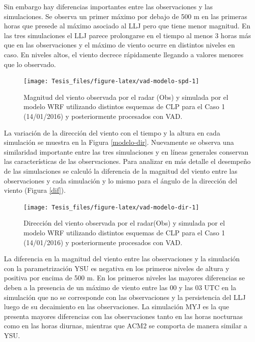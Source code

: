 \documentclass[12pt,spanish,oneside]{book}
\begin{document}
Sin embargo hay diferencias importantes entre las observaciones y las
simulaciones. Se observa un primer máximo por debajo de 500 m en las
primeras horas que presede al máximo asociado al LLJ pero que tiene
menor magnitud. En las tres simulaciones el LLJ parece prolongarse en el
tiempo al menos 3 horas más que en las observaciones y el máximo de
viento ocurre en distintos niveles en caso. En niveles altos, el viento
decrece rápidamente llegando a valores menores que lo observado.

\begin{figure}

{\centering \texttt{[image: Tesis\_files/figure-latex/vad-modelo-spd-1]} 

}

\caption{Magnitud del viento observada por el radar (Obs) y simulada por el modelo WRF utilizando distintos esquemas de CLP para el Caso 1 (14/01/2016) y posteriormente procesados con VAD. \label{modelo-spd}}\label{fig:vad-modelo-spd}
\end{figure}

La variación de la dirección del viento con el tiempo y la altura en
cada simulación se muestra en la Figura \ref{modelo-dir}. Nuevamente se
observa una similaridad importante entre las tres simulaciones y en
líneas generales conservan las características de las observaciones.
Para analizar en más detalle el desempeño de las simulaciones se calculó
la diferencia de la magnitud del viento entre las observaciones y cada
simulación y lo mismo para el ángulo de la dirección del viento (Figura
\ref{dif}).

\begin{figure}

{\centering \texttt{[image: Tesis\_files/figure-latex/vad-modelo-dir-1]} 

}

\caption{Dirección del viento observada por el radar(Obs) y simulada por el modelo WRF utilizando distintos esquemas de CLP para el Caso 1 (14/01/2016) y posteriormente procesados con VAD. \label{modelo-dir}}\label{fig:vad-modelo-dir}
\end{figure}

La diferencia en la magnitud del viento entre las observaciones y la
simulación con la parametrización YSU es negativa en los primeros
niveles de altura y positiva por encima de 500 m. En los primeros
niveles las mayores diferencias se deben a la presencia de un máximo de
viento entre las 00 y las 03 UTC en la simulación que no se corresponde
con las observaciones y la persistencia del LLJ luego de su decaimiento
en las observaciones. La simulación MYJ es la que presenta mayores
diferencias con las observaciones tanto en las horas nocturnas como en
las horas diurnas, mientras que ACM2 se comporta de manera similar a
YSU.
\end{document}
